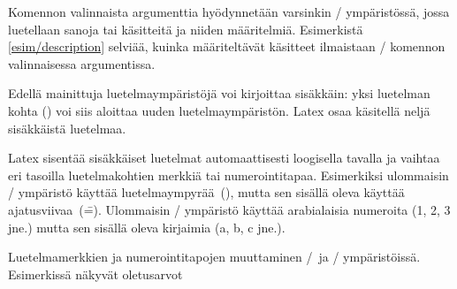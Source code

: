 Komennon valinnaista argumenttia hyödynnetään varsinkin
\-/ ympäristössä, jossa luetellaan sanoja tai
käsitteitä ja niiden määritelmiä. Esimerkistä \ref{esim/description}
selviää, kuinka määriteltävät käsitteet ilmaistaan \-/
komennon valinnaisessa argumentissa.

Edellä mainittuja luetelmaympäristöjä voi kirjoittaa sisäkkäin: yksi
luetelman kohta () voi siis aloittaa uuden
luetelmaympäristön. Latex osaa käsitellä neljä sisäkkäistä luetelmaa.

Latex sisentää sisäkkäiset luetelmat automaattisesti loogisella tavalla
ja vaihtaa eri tasoilla luetelmakohtien merkkiä tai numerointitapaa.
Esimerkiksi ulommaisin \-/ ympäristö käyttää
luetelmaympyrää~(\textbullet), mutta sen sisällä oleva käyttää
ajatusviivaa~(\==). Ulommaisin \-/ ympäristö
käyttää arabialaisia numeroita (1, 2, 3 jne.) mutta sen sisällä oleva
kirjaimia (a, b, c jne.).

\begin{esimerkki*}

\begin{koodilohko}
\renewcommand{\labelitemi}  {\textbullet} %
\renewcommand{\labelitemii} {\normalfont\bfseries\textendash}
\renewcommand{\labelitemiii}{\textasteriskcentered}
\renewcommand{\labelitemiv} {\textperiodcentered}

\renewcommand{\labelenumi}  {\arabic{enumi}.} %
\renewcommand{\labelenumii} {(\alph{enumii})}
\renewcommand{\labelenumiii}{\roman{enumiii}.}
\renewcommand{\labelenumiv} {\Alph{enumiv}.}
\end{koodilohko}
  \caption{Luetelmamerkkien ja numerointitapojen muuttaminen
    \-/\ ja \-/ ympäristöissä.
    Esimerkissä näkyvät oletusarvot}
  \label{esim/labelitem-labelenum}
\end{esimerkki*}

